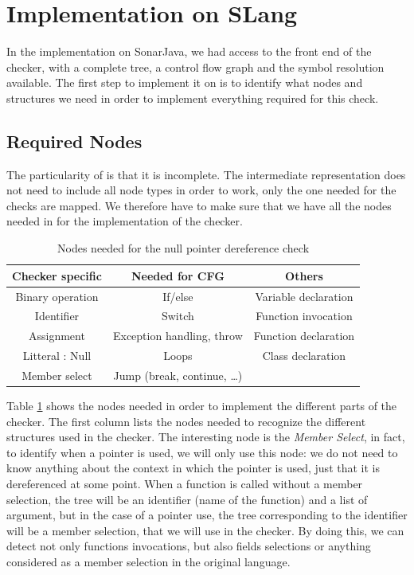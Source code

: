 \section{Implementation on SLang}
\label{sec:implementation_slang}

In the implementation on SonarJava, we had access to the front end of the checker, with a complete tree, a control flow graph and the symbol resolution available.
The first step to implement it on \slang{} is to identify what nodes and structures we need in order to implement everything required for this check.

\subsection{Required Nodes}
\label{subsec:nodes}

The particularity of \slang{} is that it is incomplete. 
The intermediate representation does not need to include all node types in order to work, only the one needed for the checks are mapped. 
We therefore have to make sure that we have all the nodes needed in \slang{} for the implementation of the checker.

\begin{table}[h]
	\caption{Nodes needed for the null pointer dereference check}
	\label{table:nodes-needed}
	\begin{tabular}{|c|c|c|}
		\hline
		\bf Checker specific & \bf Needed for CFG & \bf Others  \\ \hline
	    Binary operation & If/else & Variable declaration \\
		Identifier & Switch & Function invocation \\
		Assignment & Exception handling, throw  & Function declaration \\
		Litteral : Null & Loops & Class declaration \\
		Member select & Jump (break, continue, …) & \\ \hline
	\end{tabular}
\end{table}

Table \ref{table:nodes-needed} shows the nodes needed in order to implement the different parts of the checker.
The first column lists the nodes needed to recognize the different structures used in the checker. 
The interesting node is the \emph{Member Select}, in fact, to identify when a pointer is used, we will only use this node: we do not need to know anything about the context in which the pointer is used, just that it is dereferenced at some point.
When a function is called without a member selection, the tree will be an identifier (name of the function) and a list of argument, but in the case of a pointer use, the tree corresponding to the identifier will be a member selection, that we will use in the checker.
By doing this, we can detect not only functions invocations, but also fields selections or anything considered as a member selection in the original language.

